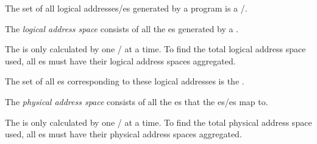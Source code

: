 The set of all logical addresses/es generated by a program is a /.

\begin{definition}\label{def:Logical_Address_Space}
  The \emph{logical address space} consists of all the es generated by a .

  \begin{remark}
    The  is only calculated by one / at a time.
    To find the total logical address space used, all es must have their logical address spaces aggregated.
  \end{remark}
\end{definition}

The set of all es corresponding to these logical addresses is the .

\begin{definition}\label{def:Physical_Address_Space}
  The \emph{physical address space} consists of all the es that the es/es map to.

  \begin{remark}
    The  is only calculated by one / at a time.
    To find the total physical address space used, all es must have their physical address spaces aggregated.
  \end{remark}
\end{definition}


